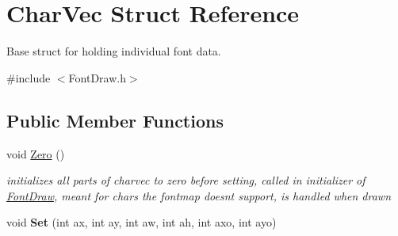\hypertarget{struct_char_vec}{}\section{Char\+Vec Struct Reference}
\label{struct_char_vec}


Base struct for holding individual font data.  




{\ttfamily \#include $<$Font\+Draw.\+h$>$}

\subsection*{Public Member Functions}
\begin{DoxyCompactItemize}
\item 
\hypertarget{struct_char_vec_aba00bd04d56e5bd8abdca1d976fcbf58}{}void \hyperlink{struct_char_vec_aba00bd04d56e5bd8abdca1d976fcbf58}{Zero} ()\label{struct_char_vec_aba00bd04d56e5bd8abdca1d976fcbf58}

\begin{DoxyCompactList}\small\item\em initializes all parts of charvec to zero before setting, called in initializer of \hyperlink{class_font_draw}{Font\+Draw}, meant for chars the fontmap doesn\textquotesingle{}t support, is handled when drawn \end{DoxyCompactList}\item 
\hypertarget{struct_char_vec_a477dcd1709c34d915d534ad0533f7b44}{}void {\bfseries Set} (int ax, int ay, int aw, int ah, int axo, int ayo)\label{struct_char_vec_a477dcd1709c34d915d534ad0533f7b44}

\end{DoxyCompactItemize}
